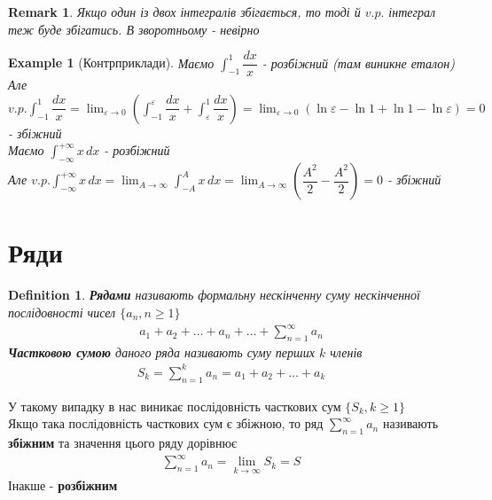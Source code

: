 \documentclass[a4paper, 14pt]{extarticle}
\def\huge{\displaystyle}
\def\bigline{\vspace{5mm}\\}
\theoremstyle{theoremdd}
\theoremstyle{theoremdd}
\newtheorem{definition}[theorem]{Definition}
\theoremstyle{theoremdd}
\theoremstyle{theoremdd}
\newtheorem{example}[theorem]{Example}
\theoremstyle{theoremdd}
\theoremstyle{theoremdd}
\newtheorem{remark}[theorem]{Remark}
\theoremstyle{theoremdd}
\theoremstyle{theoremdd}
\begin{document}
\begin{remark}
Якщо один із двох інтегралів збігається, то тоді й $v.p.$ інтеграл теж буде збігатись. В зворотньому - невірно
\end{remark}


\begin{example}[Контрприклади]
Маємо $\huge\int_{-1}^1 \dfrac{dx}{x}$ - розбіжний (там виникне еталон)\\
Але $v.p. \huge\int_{-1}^1 \dfrac{dx}{x} = \huge\lim_{\varepsilon \to 0} \left( \int_{-1}^\varepsilon \dfrac{dx}{x} + \int_{\varepsilon}^1 \dfrac{dx}{x} \right) = \huge\lim_{\varepsilon \to 0} (\ln \varepsilon - \ln 1 + \ln 1 - \ln \varepsilon) = 0$ - збіжний
\bigline
Маємо $\huge\int_{-\infty}^{+\infty} x\,dx$ - розбіжний\\
Але $v.p. \huge\int_{-\infty}^{+\infty} x\,dx = \lim_{A \to \infty} \int_{-A}^{A} x\,dx = \lim_{A \to \infty} \left( \dfrac{A^2}{2} - \dfrac{A^2}{2} \right)= 0$ - збіжний
\end{example}
\newpage

\section{Ряди}
\begin{definition}
\textbf{Рядами} називають формальну нескінченну суму нескінченної послідовності чисел $\{a_n, n \geq 1\}$
\begin{align*}
a_1 + a_2 + \dots + a_n + \dots + \huge \sum_{n=1}^{\infty} a_n
\end{align*}
\textbf{Частковою сумою} даного ряда називають суму перших $k$ членів
\begin{align*}
S_k = \sum_{n=1}^k a_n = a_1 + a_2 + \dots + a_k
\end{align*}
\end{definition}

У такому випадку в нас виникає послідовність часткових сум $\{S_k, k \geq 1\}$\\
Якщо така послідовність часткових сум є збіжною, то ряд $\huge \sum_{n=1}^{\infty} a_n$ називають \textbf{збіжним} та значення цього ряду дорівнює
\begin{align*}
\sum_{n=1}^{\infty} a_n = \lim_{k \to \infty} S_k = S
\end{align*}
Інакше - \textbf{розбіжним}
\bigline
\end{document}
